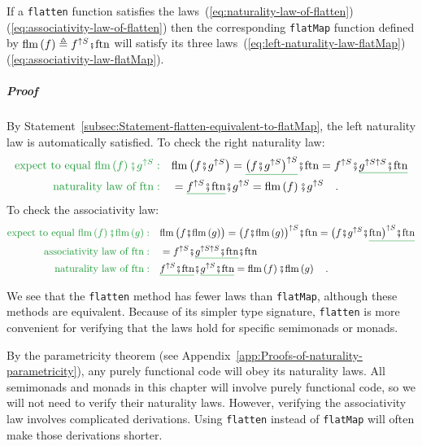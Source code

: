 If a \lstinline!flatten! function satisfies the laws~(\ref{eq:naturality-law-of-flatten})\textendash (\ref{eq:associativity-law-of-flatten})
then the corresponding \lstinline!flatMap! function defined by $\text{flm}\left(f\right)\triangleq f^{\uparrow S}\bef\text{ftn}$
will satisfy its three laws~(\ref{eq:left-naturality-law-flatMap})\textendash (\ref{eq:associativity-law-flatMap}).

\subparagraph{Proof}

By Statement~\ref{subsec:Statement-flatten-equivalent-to-flatMap},
the left naturality law is automatically satisfied. To check the right
naturality law:
\begin{align*}
{\color{greenunder}\text{expect to equal }\text{flm}\left(f\right)\bef g^{\uparrow S}:}\quad & \text{flm}\,\big(f\bef g^{\uparrow S}\big)=\gunderline{\big(f\bef g^{\uparrow S}\big)^{\uparrow S}}\bef\text{ftn}=f^{\uparrow S}\bef\gunderline{g^{\uparrow S\uparrow S}\bef\text{ftn}}\\
{\color{greenunder}\text{naturality law of }\text{ftn}:}\quad & =\gunderline{f^{\uparrow S}\bef\text{ftn}}\bef g^{\uparrow S}=\text{flm}\left(f\right)\bef g^{\uparrow S}\quad.
\end{align*}
To check the associativity law:
\begin{align*}
{\color{greenunder}\text{expect to equal }\text{flm}\left(f\right)\bef\text{flm}\left(g\right):}\quad & \text{flm}\,\big(f\bef\text{flm}\,(g)\big)=\big(f\bef\text{flm}\,(g)\big)^{\uparrow S}\bef\text{ftn}=\big(f\bef g^{\uparrow S}\bef\gunderline{\text{ftn}\big)^{\uparrow S}\bef\text{ftn}}\\
{\color{greenunder}\text{associativity law of }\text{ftn}:}\quad & =f^{\uparrow S}\bef\gunderline{g^{\uparrow S\uparrow S}\bef\text{ftn}}\bef\text{ftn}\\
{\color{greenunder}\text{naturality law of }\text{ftn}:}\quad & \gunderline{f^{\uparrow S}\bef\text{ftn}}\bef\gunderline{g^{\uparrow S}\bef\text{ftn}}=\text{flm}\left(f\right)\bef\text{flm}\left(g\right)\quad.
\end{align*}
 

We see that the \lstinline!flatten! method has fewer laws than \lstinline!flatMap!,
although these methods are equivalent. Because of its simpler type
signature, \lstinline!flatten! is more convenient for verifying that
the laws hold for specific semimonads or monads. 

By the parametricity theorem (see Appendix~\ref{app:Proofs-of-naturality-parametricity}),
any purely functional code will obey its naturality laws. All semimonads
and monads in this chapter will involve purely functional code, so
we will not need to verify their naturality laws. However, verifying
the associativity law involves complicated derivations. Using \lstinline!flatten!
instead of \lstinline!flatMap! will often make those derivations
shorter.

